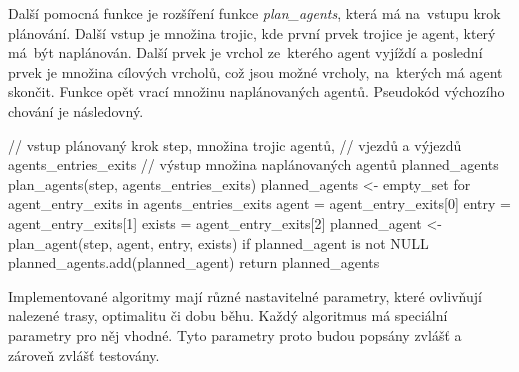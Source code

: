 Další pomocná funkce je rozšíření funkce \emph{plan\_agents}, která má na~vstupu krok plánování.
Další vstup je množina trojic, kde
první prvek trojice je agent, který má~být naplánován.
Další prvek je vrchol ze~kterého agent vyjíždí a
poslední prvek je množina cílových vrcholů, což jsou možné vrcholy, na~kterých má agent skončit.
Funkce opět vrací množinu naplánovaných agentů.
Pseudokód výchozího chování je následovný.
\begin{code}[xrightmargin=6em]
// vstup plánovaný krok step, množina trojic agentů,
// vjezdů a výjezdů agents_entries_exits
// výstup množina naplánovaných agentů planned_agents
plan_agents(step, agents_entries_exits)
  planned_agents <- empty_set
  for agent_entry_exits in agents_entries_exits
    agent = agent_entry_exits[0]
    entry = agent_entry_exits[1]
    exists = agent_entry_exits[2]
    planned_agent <- plan_agent(step, agent, entry, exists)
    if planned_agent is not NULL
      planned_agents.add(planned_agent)
  return planned_agents
\end{code}

Implementované algoritmy mají různé nastavitelné parametry, které ovlivňují nalezené trasy, optimalitu či dobu běhu.
Každý algoritmus má speciální parametry pro něj vhodné.
Tyto parametry proto budou popsány zvlášť a zároveň zvlášť testovány.








